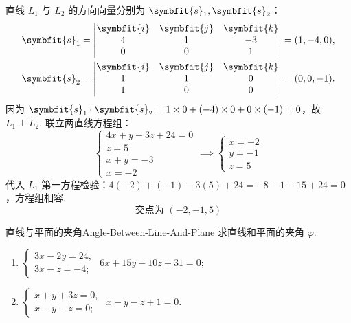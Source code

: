 \begin{solution}
    直线 $L_1$ 与 $L_2$ 的方向向量分别为 $\symbfit{s}_1, \symbfit{s}_2$：
    \begin{equation}
        \begin{aligned}
            \symbfit{s}_1 & = \begin{vmatrix} \symbfit{i} & \symbfit{j} & \symbfit{k} \\ 4 & 1 & -3 \\ 0 & 0 & 1 \end{vmatrix} = (1, -4, 0), \\
            \symbfit{s}_2 & = \begin{vmatrix} \symbfit{i} & \symbfit{j} & \symbfit{k} \\ 1 & 1 & 0 \\ 1 & 0 & 0 \end{vmatrix} = (0, 0, -1).
        \end{aligned}
    \end{equation}
    因为 $\symbfit{s}_1 \cdot \symbfit{s}_2 = 1 \times 0 + (-4) \times 0 + 0 \times (-1) = 0$，故 $L_1 \perp L_2$.
    联立两直线方程组：
    \begin{equation}
        \begin{cases} 4x + y - 3z + 24 = 0 \\ z = 5 \\ x + y = -3 \\ x = -2 \end{cases} \implies \begin{cases} x = -2 \\ y = -1 \\ z = 5 \end{cases}
    \end{equation}
    代入 $L_1$ 第一方程检验：$4(-2) + (-1) - 3(5) + 24 = -8 - 1 - 15 + 24 = 0$，方程组相容.
    \begin{equation}
        \boxed{ \text{交点为 } (-2, -1, 5) }
    \end{equation}
\end{solution}


\begin{problem}{直线与平面的夹角}{Angle-Between-Line-And-Plane}
    求直线和平面的夹角 $\varphi$.
    \begin{enumerate}
        \item \(\begin{cases} 3x - 2y = 24, \\ 3x - z = -4; \end{cases}\) \quad \(6x + 15y - 10z + 31 = 0;\)
        \item \(\begin{cases} x + y + 3z = 0, \\ x - y - z = 0; \end{cases}\) \quad \(x - y - z + 1 = 0.\)
    \end{enumerate}
\end{problem}

